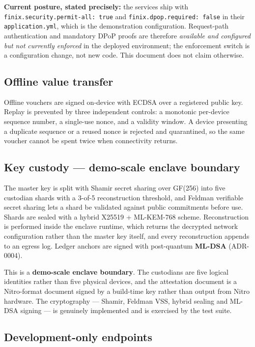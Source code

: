 \documentclass[11pt,a4paper]{article}
\newcommand{\pth}[1]{\texttt{\small #1}}
\begin{document}
\noindent\textbf{Current posture, stated precisely:} the services ship with
\pth{finix.security.permit-all: true} and \pth{finix.dpop.required: false} in their
\pth{application.yml}, which is the demonstration configuration. Request-path authentication and
mandatory DPoP proofs are therefore \emph{available and configured but not currently enforced} in
the deployed environment; the enforcement switch is a configuration change, not new code. This
document does not claim otherwise.

\subsection{Offline value transfer}

Offline vouchers are signed on-device with ECDSA over a registered public key. Replay is prevented
by three independent controls: a monotonic per-device sequence number, a single-use nonce, and a
validity window. A device presenting a duplicate sequence or a reused nonce is rejected and
quarantined, so the same voucher cannot be spent twice when connectivity returns.

\subsection{Key custody --- demo-scale enclave boundary}

The master key is split with Shamir secret sharing over GF(256) into five custodian shards with a
3-of-5 reconstruction threshold, and Feldman verifiable secret sharing lets a shard be validated
against public commitments before use. Shards are sealed with a hybrid X25519 + ML-KEM-768 scheme.
Reconstruction is performed inside the enclave runtime, which returns the decrypted network
configuration rather than the master key itself, and every reconstruction appends to an egress log.
Ledger anchors are signed with post-quantum \textbf{ML-DSA} (ADR-0004).

\noindent This is a \textbf{demo-scale enclave boundary}. The custodians are five logical
identities rather than five physical devices, and the attestation document is a Nitro-format
document signed by a build-time key rather than output from Nitro hardware. The cryptography ---
Shamir, Feldman VSS, hybrid sealing and ML-DSA signing --- is genuinely implemented and is
exercised by the test suite.

\subsection{Development-only endpoints}
\end{document}
